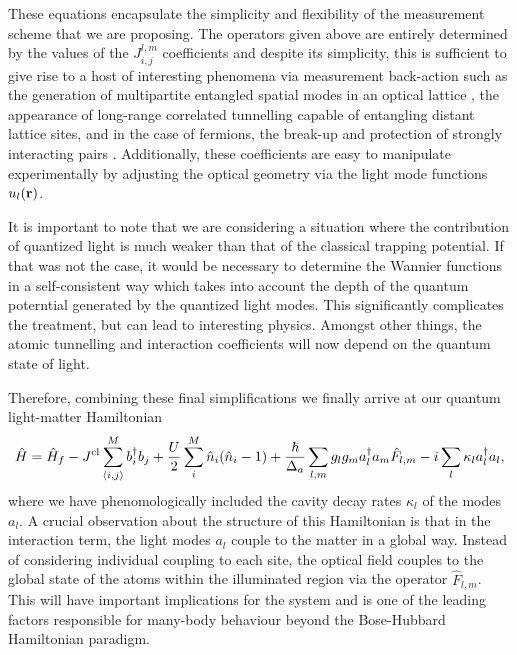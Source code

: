  These equations
encapsulate the simplicity and flexibility of the measurement scheme
that we are proposing. The operators given above are entirely
determined by the values of the $J^{l,m}_{i,j}$ coefficients and
despite its simplicity, this is sufficient to give rise to a host of
interesting phenomena via measurement back-action such as the
generation of multipartite entangled spatial modes in an optical
lattice \cite{elliott2015, atoms2015, mekhov2009pra}, the appearance
of long-range correlated tunnelling capable of entangling distant
lattice sites, and in the case of fermions, the break-up and
protection of strongly interacting pairs \cite{mazzucchi2016,
  kozlowski2016zeno}. Additionally, these coefficients are easy to
manipulate experimentally by adjusting the optical geometry via the
light mode functions $u_l(\mathbf{r})$.

It is important to note that we are considering a situation where the
contribution of quantized light is much weaker than that of the
classical trapping potential. If that was not the case, it would be
necessary to determine the Wannier functions in a self-consistent way
which takes into account the depth of the quantum poterntial generated
by the quantized light modes. This significantly complicates the
treatment, but can lead to interesting physics. Amongst other things,
the atomic tunnelling and interaction coefficients will now depend on
the quantum state of light.  

Therefore, combining these final simplifications we finally arrive at
our quantum light-matter Hamiltonian
\begin{equation}
  \label{eq:fullH}
  \hat{H} = \hat{H}_f -J^\mathrm{cl} \sum_{\langle i,j \rangle}^M b^\dagger_i b_j + 
  \frac{U}{2} \sum_{i}^M \hat{n}_i (\hat{n}_i - 1) + 
  \frac{\hbar}{\Delta_a} \sum_{l,m} g_l g_m a^\dagger_l a_m \hat{F}_{l,m} -
  i \sum_l \kappa_l a^\dagger_l a_l,
\end{equation}
where we have phenomologically included the cavity decay rates
$\kappa_l$ of the modes $a_l$. A crucial observation about the
structure of this Hamiltonian is that in the interaction term, the
light modes $a_l$ couple to the matter in a global way. Instead of
considering individual coupling to each site, the optical field
couples to the global state of the atoms within the illuminated region
via the operator $\hat{F}_{l,m}$. This will have important
implications for the system and is one of the leading factors
responsible for many-body behaviour beyond the Bose-Hubbard
Hamiltonian paradigm. 

